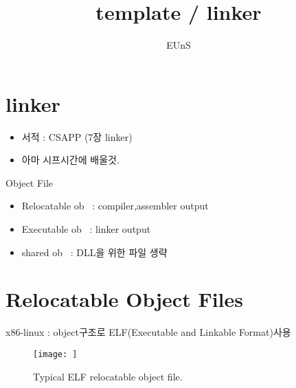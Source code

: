 \documentclass[10pt]{beamer}
\title{template / linker}
\author{EUnS}
\begin{document}

\begin{frame}{}
    \maketitle
\end{frame}    

\begin{frame}{}
    \tableofcontents
\end{frame}   

\section{linker}

\begin{frame}
    \begin{itemize}
        \item 서적 : CSAPP (7장 linker)
        \item 아마 시프시간에 배울것.
    \end{itemize}
\end{frame}

\begin{frame}{Object File}
    
    \begin{itemize}
        \item Relocatable ob~ : compiler,assembler output
        \item Executable ob~ : linker output
        \item shared ob~ : DLL을 위한 파일 생략
    \end{itemize}
\end{frame}    


\section{Relocatable Object Files}

\begin{frame}{}
    x86-linux : object구조로 ELF(Executable and Linkable Format)사용
    \begin{figure}[h!]
        \centering
        \texttt{[image: ]}
        \caption{Typical ELF relocatable object file.}
    \end{figure}
\end{frame}    
\end{document}
